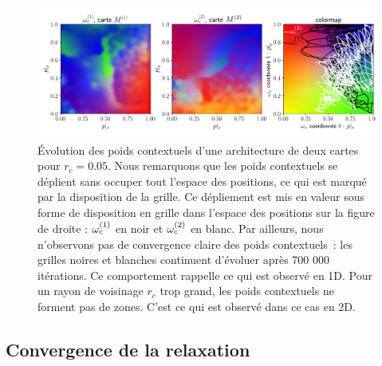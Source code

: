 \documentclass[../main]{subfiles}
\begin{document}
\begin{figure}[t]
	\includegraphics[width=\textwidth]{wc_rc005_grid.pdf}
	\caption{\'Evolution des poids contextuels d'une architecture de deux cartes pour $r_c =0.05$. 
	Nous remarquons que les poids contextuels se déplient sans occuper tout l'espace des positions, ce qui est marqué par la disposition de la grille. Ce dépliement est mis en valeur sous forme de disposition en grille dans l'espace des positions sur la figure de droite : $\omega_c^{({1})}$ en noir et $\omega_c^{({2})}$ en blanc. Par ailleurs, nous n'observons pas de convergence claire des poids contextuels~: les grilles noires et blanches continuent d'évoluer après 700 000 itérations.
	Ce comportement rappelle ce qui est observé en 1D. Pour un rayon de voisinage $r_c$ trop grand, les poids contextuels ne forment pas de zones. C'est ce qui est observé dans ce cas en 2D.
	\label{fig:rc_005}}
\end{figure}



\subsection{Convergence de la relaxation \label{par:conv2D}}
\end{document}
